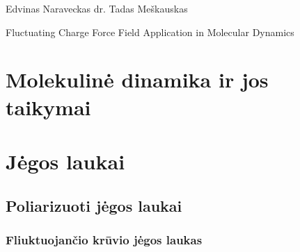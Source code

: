 \documentclass[a4paper,12pt,fleqn,tikz]{article}
\begin{document}
    {Edvinas Naraveckas}
    {}{}{}{}%
    {dr. Tadas Meškauskas}

    \tableofcontents



    \bothabstracts{}%
    {Fluctuating Charge Force Field Application in Molecular Dynamics} %
    {}%


    



    \newpage
    \section{Molekulinė dinamika ir jos taikymai}
    \label{sec:molecular_dynamics_section}
    


    \newpage
    \section{Jėgos laukai}
    \label{sec:force_field}
    


    \subsection{Poliarizuoti jėgos laukai}
    \label{sec:polarized_force_fields}
    


    \subsubsection{Fliuktuojančio krūvio jėgos laukas}
    \label{sec:fluctuating_charge}
    
\end{document}
